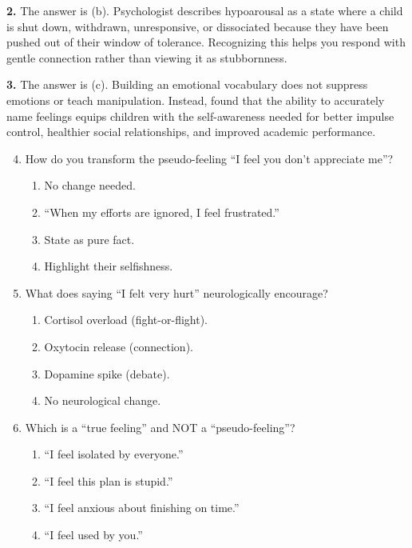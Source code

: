 \begin{practiceexercise}
\textbf{2.} The answer is (b). 
Psychologist \citet{siegel2011} describes hypoarousal as a state where a child is shut down, withdrawn, unresponsive, or dissociated because they have been pushed out of their window of tolerance. Recognizing this helps you respond with gentle connection rather than viewing it as stubbornness.

\textbf{3.} The answer is (c). 
Building an emotional vocabulary does not suppress emotions or teach manipulation. Instead, \citet{gottman1997} found that the ability to accurately name feelings equips children with the self-awareness needed for better impulse control, healthier social relationships, and improved academic performance.
\vspace{\fill}
\newpage

\begin{enumerate}
    \setcounter{enumi}{3}
    \item How do you transform the pseudo-feeling ``I feel you don't appreciate me''?
    \begin{enumerate}
        \item No change needed.
        \item ``When my efforts are ignored, I feel frustrated.''
        \item State as pure fact.
        \item Highlight their selfishness.
    \end{enumerate}
    \vspace{\fill}
    \item What does saying ``I felt very hurt'' neurologically encourage?
    \begin{enumerate}
        \item Cortisol overload (fight-or-flight).
        \item Oxytocin release (connection).
        \item Dopamine spike (debate).
        \item No neurological change.
    \end{enumerate}
    \vspace{\fill}
    \item Which is a ``true feeling'' and NOT a ``pseudo-feeling''?
    \begin{enumerate}
        \item ``I feel isolated by everyone.''
        \item ``I feel this plan is stupid.''
        \item ``I feel anxious about finishing on time.''
        \item ``I feel used by you.''
    \end{enumerate}
\end{enumerate}
\vspace{\fill}
\newpage


\end{practiceexercise}
